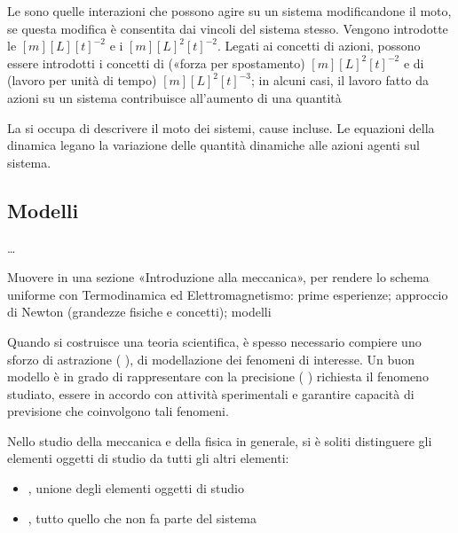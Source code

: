 \documentclass[letterpaper,10pt,italian]{jupyterBook}
\begin{document}
\sphinxAtStartPar
Le  sono quelle interazioni che possono agire su un sistema modificandone il moto, se questa modifica è consentita dai vincoli del sistema stesso. Vengono introdotte le  \([m][L][t]^{-2}\) e i  \([m][L]^2[t]^{-2}\). Legati ai concetti di azioni, possono essere introdotti i concetti di  («forza per spostamento) \([m][L]^2[t]^{-2}\) e di  (lavoro per unità di tempo) \([m][L]^2[t]^{-3}\); in alcuni casi, il lavoro fatto da azioni su un sistema contribuisce all’aumento di una quantità

\sphinxAtStartPar
La  si occupa di descrivere il moto dei sistemi, cause incluse. Le equazioni della dinamica legano la variazione delle quantità dinamiche alle azioni agenti sul sistema.


\subsection{Modelli}
\label{\detokenize{ch/mechanics/intro-vocabulary:modelli}}
\sphinxAtStartPar
…

\sphinxAtStartPar
Muovere in una sezione «Introduzione alla meccanica», per rendere lo schema uniforme con Termodinamica ed Elettromagnetismo: prime esperienze; approccio di Newton (grandezze fisiche e concetti); modelli

\sphinxAtStartPar
Quando si costruisce una teoria scientifica, è spesso necessario compiere uno sforzo di astrazione ( ), di modellazione dei fenomeni di interesse. Un buon modello è in grado di rappresentare con la precisione ( ) richiesta il fenomeno studiato, essere in accordo con attività sperimentali e garantire capacità di previsione che coinvolgono tali fenomeni.

\sphinxAtStartPar
Nello studio della meccanica e della fisica in generale, si è soliti distinguere gli elementi oggetti di studio da tutti gli altri elementi:
\begin{itemize}
\item {} 
\sphinxAtStartPar
{}, unione degli elementi oggetti di studio

\item {} 
\sphinxAtStartPar
{}, tutto quello che non fa parte del sistema

\end{itemize}
\end{document}
